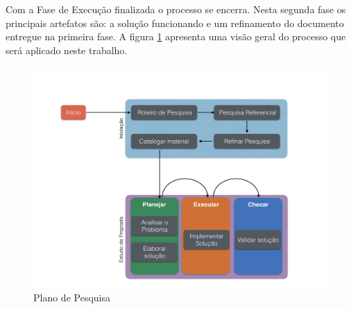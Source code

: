 Com a Fase de Execução finalizada o processo se encerra. Nesta segunda fase os principais artefatos são: a solução funcionando e um refinamento do documento entregue na primeira fase. A figura \ref{Rotulo} apresenta uma visão geral do processo que será aplicado neste trabalho.
\graphicspath{{figuras/}}
\begin{figure}
\centering
\includegraphics[scale=0.40]{TCCMetodologia}
\caption{Plano de Pesquisa}
\label{Rotulo}
\end{figure}

